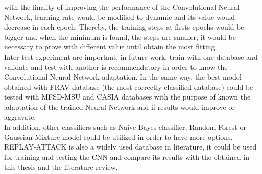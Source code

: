 with the finality of improving the performance of the Convolutional Neural Network, learning rate would be modified to dynamic and its value would decrease in each epoch. Thereby, the training steps at firsts epochs would be bigger and when the minimum is found, the steps are smaller, it would be necessary to prove with different value until obtain the most fitting.\\

Inter-test experiment are important, in future work, train with one database and validate and test with another is recommendatory in order to know the Convolutional Neural Network adaptation. In the same way, the best model obtained with FRAV database (the most correctly classified database) could be tested with MFSD-MSU and CASIA databases with the purpose of known the adaptation of the trained Neural Network and if results would improve or aggravate.\\

In addition, other classifiers such as Naive Bayes classifier, Random Forest or Gaussian Mixture model could be utilized in order to have more options.\\

REPLAY-ATTACK is also a widely used database in literature, it could be used for training and testing the CNN and compare its results with the obtained in this thesis and the literature review.